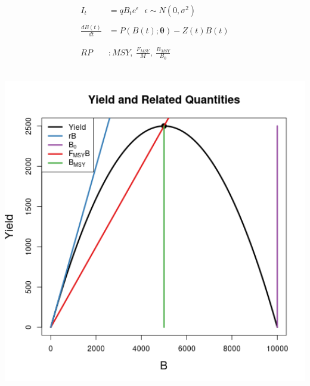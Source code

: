 \documentclass[ xcolor = pdftex, dvipsnames, table ]{beamer}
\begin{document}
%
\begin{frame}
$~$\\\hspace*{-0.5cm}
\begin{minipage}[h!]{0.49\textwidth}
\begin{align*}
I_t &= q B_t e^\epsilon ~~~ \epsilon\sim N(0, \sigma^2) \\
~\\
\frac{dB(t)}{dt} &= P(B(t);\bm{\theta}) - Z(t)B(t)\\
~\\~\\
RP &: MSY, ~\frac{F_{MSY}}{M}, ~\frac{B_{MSY}}{B_0} 
\end{align*}
\end{minipage}
\begin{minipage}[h!]{0.49\textwidth}
$~$\\\hspace*{0.2cm}
\includegraphics[width=1.2\textwidth]{../advance/plots/yieldRPplus.png}
\end{minipage}
\end{frame}
\end{document}
